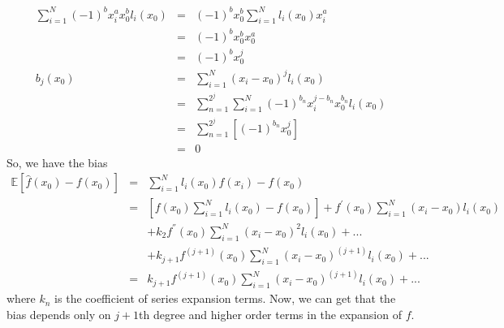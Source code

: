 \documentclass[11pt, oneside]{article}   	%
\begin{document}
\begin{eqnarray}
\sum_{i = 1}^N (-1)^b x_i^a x_0^b l_i(x_0) &=& (-1)^b x_0^b \sum_{i = 1}^N l_i(x_0) x_i^a\\
&=& (-1)^b x_0^b x_0^a\\
&=& (-1)^b x_0^j\\
b_j(x_0) &=& \sum_{i = 1}^N (x_i - x_0)^j l_i(x_0)\\
&=& \sum_{n = 1}^{2^j} \sum_{i = 1}^N (-1)^{b_n} x_i^{j - b_n} x_0^{b_n} l_i(x_0) \\
&=& \sum_{n = 1}^{2^j} [ (-1)^{b_n} x_0^j]\\
&=& 0
\end{eqnarray}
So, we have the bias
\begin{eqnarray}
\mathbb{E}[\hat{f}(x_0) - f(x_0)] &=& \sum_{i = 1}^N l_i(x_0)f(x_i) - f(x_0)\\
&=& [f(x_0) \sum_{i = 1}^N l_i(x_0) - f(x_0)] + f^{'}(x_0) \sum_{i = 1}^N (x_i - x_0) l_i(x_0) \nonumber \\
&& + k_2 f^{''}(x_0) \sum_{i = 1}^N (x_i - x_0)^2 l_i(x_0) + ... \nonumber \\
&& + k_{j+1} f^{(j+1)}(x_0) \sum_{i = 1}^N (x_i - x_0)^{(j+1)} l_i(x_0) + ... \\
&=& k_{j+1} f^{(j+1)}(x_0) \sum_{i = 1}^N (x_i - x_0)^{(j+1)} l_i(x_0) + ...
\end{eqnarray}
where $k_n$ is the coefficient of series expansion terms. Now, we can get that the bias depends only on $j+1$th degree and higher order terms in the expansion of $f$.
\end{document}

